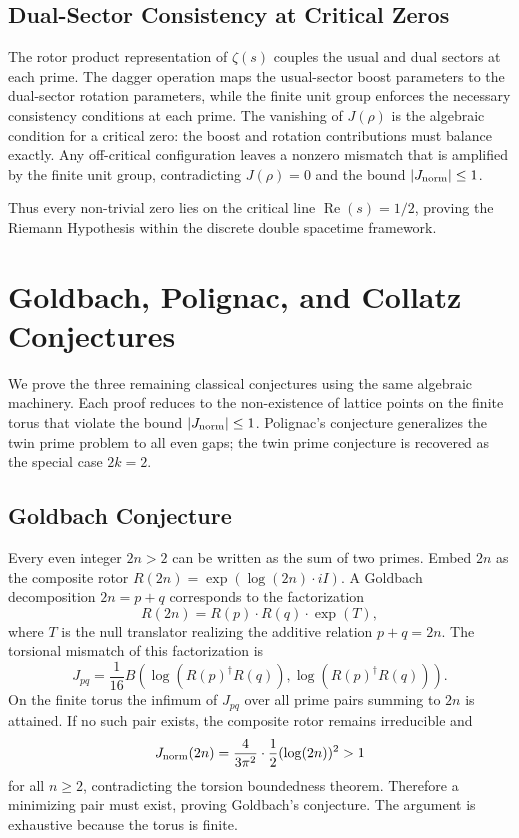 \documentclass[dvipdfmx,a4paper]{article}
\theoremstyle{definition}
\theoremstyle{remark}
\newcommand{\Jnorm}{J_{\rm norm}}
\begin{document}
\subsection{Dual-Sector Consistency at Critical Zeros}

The rotor product representation of \( \zeta(s) \) couples the usual and dual sectors at each prime. The dagger operation maps the usual-sector boost parameters to the dual-sector rotation parameters, while the finite unit group enforces the necessary consistency conditions at each prime. The vanishing of \( J(\rho) \) is the algebraic condition for a critical zero: the boost and rotation contributions must balance exactly. Any off-critical configuration leaves a nonzero mismatch that is amplified by the finite unit group, contradicting \( J(\rho) = 0 \) and the bound \( |\Jnorm| \leq 1 \).

Thus every non-trivial zero lies on the critical line \( \operatorname{Re}(s) = 1/2 \), proving the Riemann Hypothesis within the discrete double spacetime framework.

\section{Goldbach, Polignac, and Collatz Conjectures}

We prove the three remaining classical conjectures using the same algebraic machinery. Each proof reduces to the non-existence of lattice points on the finite torus that violate the bound \( |\Jnorm| \leq 1 \). Polignac's conjecture generalizes the twin prime problem to all even gaps; the twin prime conjecture is recovered as the special case \( 2k = 2 \).

\subsection{Goldbach Conjecture}

Every even integer \( 2n > 2 \) can be written as the sum of two primes. Embed \( 2n \) as the composite rotor \( R(2n) = \exp(\log(2n) \cdot iI) \). A Goldbach decomposition \( 2n = p + q \) corresponds to the factorization
\[
R(2n) = R(p) \cdot R(q) \cdot \exp(T),
\]
where \( T \) is the null translator realizing the additive relation \( p + q = 2n \). The torsional mismatch of this factorization is
\[
J_{pq} = \frac{1}{16} B(\log(R(p)^\dagger R(q)), \log(R(p)^\dagger R(q))).
\]
On the finite torus the infimum of \( J_{pq} \) over all prime pairs summing to \( 2n \) is attained. If no such pair exists, the composite rotor remains irreducible and
\[
J_{\rm norm}(2n) = \frac{4}{3\pi^2} \cdot \frac12 (\log(2n))^2 > 1
\]
for all \( n \geq 2 \), contradicting the torsion boundedness theorem. Therefore a minimizing pair must exist, proving Goldbach’s conjecture. The argument is exhaustive because the torus is finite.
\end{document}
